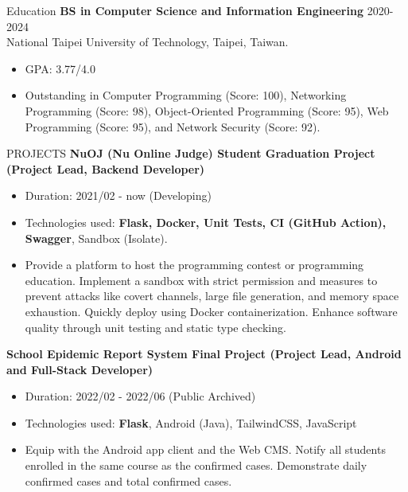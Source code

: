 \documentclass{resume} %
\begin{document}

\begin{rSection}{Education}
{\bf BS in Computer Science and Information Engineering} \hfill {2020-2024} \\
{National Taipei University of Technology, Taipei, Taiwan.}
\begin{itemize}
  \item GPA: 3.77/4.0
  \item {
    Outstanding in Computer Programming (Score: 100), 
    Networking Programming (Score: 98), 
    Object-Oriented Programming (Score: 95), 
    Web Programming (Score: 95),
    and Network Security (Score: 92).
  }
\end{itemize}
\end{rSection}

\begin{rSection}{PROJECTS}
{\bf NuOJ (Nu Online Judge) \hfill {Student Graduation Project (Project Lead, Backend Developer)}}
    \begin{itemize}
        \item {Duration: 2021/02 - now (Developing)}
        \item {Technologies used: {\bf Flask, Docker, Unit Tests, CI (GitHub Action), Swagger}, Sandbox (Isolate).}
        \item {Provide a platform to host the programming contest or programming education. Implement a sandbox with strict permission and measures to prevent attacks like covert channels, large file generation, and memory space exhaustion. Quickly deploy using Docker containerization. Enhance software quality through unit testing and static type checking.}
    \end{itemize}

{\bf School Epidemic Report System \hfill {Final Project (Project Lead, Android and Full-Stack Developer)}}
    \begin{itemize}
        \item {Duration: 2022/02 - 2022/06 (Public Archived)}
        \item {Technologies used: {\bf Flask}, Android (Java), TailwindCSS, JavaScript}
        \item {Equip with the Android app client and the Web CMS. Notify all students enrolled in the same course as the confirmed cases. Demonstrate daily confirmed cases and total confirmed cases.}
    \end{itemize}
\end{rSection}
\end{document}
